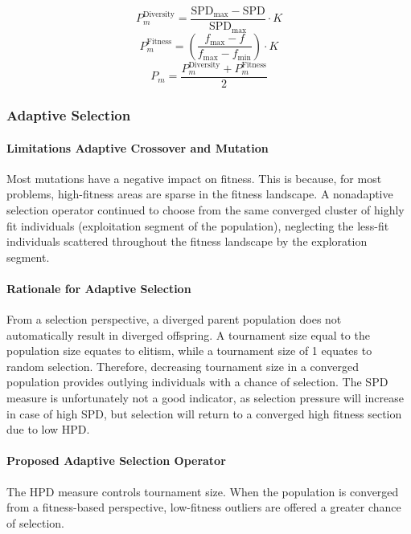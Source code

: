 \documentclass[../main.tex]{subfiles}
\begin{document}
\begin{equation}
P_m^{\text{Diversity}} = \frac{\text{SPD}_\text{max} - \text{SPD}}{\text{SPD}_\text{max}} \cdot K
\end{equation}
\begin{equation}
P_m^{\text{Fitness}} = \left( \frac{f_{\text{max}} - f}{f_{\text{max}} - f_{\text{min}}} \right) \cdot K
\end{equation}
\begin{equation}
	P_m = \frac{P_m^{\text{Diversity}}  + P_m^{\text{Fitness}}}{2}
\end{equation}

\subsubsection{Adaptive Selection}

\paragraph{Limitations Adaptive Crossover and Mutation} Most mutations have a negative impact on fitness. This is
because, for most problems, high-fitness areas are sparse in the fitness landscape. A nonadaptive selection operator
continued to choose from the same converged cluster of highly fit individuals (exploitation segment of the population),
neglecting the less-fit individuals scattered throughout the fitness landscape by the exploration segment.

\paragraph{Rationale for Adaptive Selection} From a selection perspective, a diverged parent population does not
automatically result in diverged offspring.  A tournament size equal to the population size equates to elitism, while a
tournament size of 1 equates to random selection. Therefore, decreasing tournament size in a converged population
provides outlying individuals with a chance of selection. The SPD measure is unfortunately not a good indicator, as
selection pressure will increase in case of high SPD, but selection will return to a converged high fitness section due
to low HPD.

\paragraph{Proposed Adaptive Selection Operator} The HPD measure controls tournament size. When the population is
converged from a fitness-based perspective, low-fitness outliers are offered a greater chance of selection.
\end{document}
